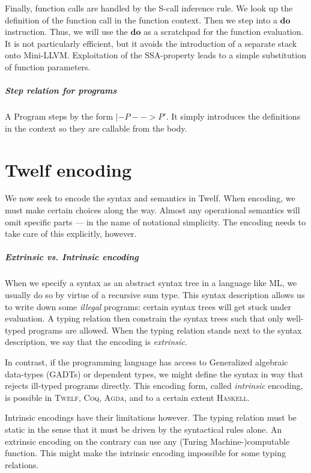 \documentclass[a4paper, oneside, 10pt, draft]{memoir}
\newcommand{\twelf}{\textsc{Twelf}}
\newcommand{\coq}{\textsc{Coq}}
\newcommand{\agda}{\textsc{Agda}}
\newcommand{\haskell}{\textsc{Haskell}}
\begin{document}
Finally, function calls are handled by the S-call inference rule. We
look up the definition of the function call in the function
context. Then we step into a $\mathbf{do}$ instruction. Thus, we will
use the $\mathbf{do}$ as a scratchpad for the function evaluation. It
is not particularly efficient, but it avoids the introduction of a
separate stack onto Mini-LLVM. Exploitation of the SSA-property leads
to a simple substitution of function parameters.

\paragraph{Step relation for programs}

A Program steps by the form $\boxed{|- P --> P'}$. It simply
introduces the definitions in the context so they are callable from
the body.

\chapter{Twelf encoding}

We now seek to encode the syntax and semantics in Twelf. When
encoding, we must make certain choices along the way. Almost any
operational semantics will omit specific parts --- in the name of
notational simplicity. The encoding needs to take care of this
explicitly, however.

\paragraph{Extrinsic vs. Intrinsic encoding}

When we specify a syntax as an abstract syntax tree in a language like
ML, we usually do so by virtue of a recursive sum type. This syntax
description allows us to write down some \emph{illegal} programs:
certain syntax trees will get stuck under evaluation. A typing
relation then constrain the syntax trees such that only well-typed
programs are allowed. When the typing relation stands next to the
syntax description, we say that the encoding is \emph{extrinsic}.

In contrast, if the programming language has access to Generalized
algebraic data-types (GADTs) or dependent types, we might define the
syntax in way that rejects ill-typed programs directly. This encoding
form, called \emph{intrinsic} encoding, is possible in \twelf{},
\coq{}, \agda{}, and to a certain extent \haskell{}.

Intrinsic encodings have their limitations however. The typing
relation must be static in the sense that it must be driven by the
syntactical rules alone. An extrinsic encoding on the contrary can use
any (Turing Machine-)computable function. This might make the
intrinsic encoding impossible for some typing relations.
\end{document}
